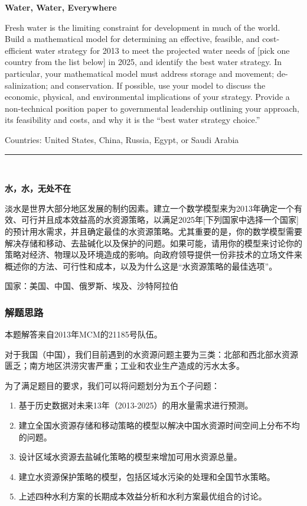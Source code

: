 \documentclass[bwprint]{cumcmthesis}
\begin{document}
\begin{shaded}
\renewcommand{\baselinestretch}{1.0}
\begin{center}
\textbf{Water, Water, Everywhere}
\end{center}

\small\noindent
Fresh water is the limiting constraint for development in much of the world. Build a mathematical model for determining an effective, feasible, and cost-efficient water strategy for 2013 to meet the projected water needs of [pick one country from the list below] in 2025, and identify the best water strategy. In particular, your mathematical model must address storage and movement; de-salinization; and conservation. If possible, use your model to discuss the economic, physical, and environmental implications of your strategy. Provide a non-technical position paper to governmental leadership outlining your approach, its feasibility and costs, and why it is the “best water strategy choice.”
\newline

\noindent Countries: United States, China, Russia, Egypt, or Saudi Arabia

\noindent\rule{\textwidth}{0.1mm}
\normalsize\ 
\begin{center}
\textbf{水，水，无处不在}
\end{center}

\small\noindent 
淡水是世界大部分地区发展的制约因素。建立一个数学模型来为2013年确定一个有效、可行并且成本效益高的水资源策略，以满足2025年[下列国家中选择一个国家]的预计用水需求，并且确定最佳的水资源策略。尤其重要的是，你的数学模型需要解决存储和移动、去盐碱化以及保护的问题。如果可能，请用你的模型来讨论你的策略对经济、物理以及环境造成的影响。向政府领导提供一份非技术的立场文件来概述你的方法、可行性和成本，以及为什么这是“水资源策略的最佳选项”。\newline

\noindent 国家：美国、中国、俄罗斯、埃及、沙特阿拉伯
\end{shaded}

\subsubsection{解题思路}

本题解答来自2013年MCM的21185号队伍。

对于我国（中国），我们目前遇到的水资源问题主要为三类：北部和西北部水资源匮乏；南方地区洪涝灾害严重；工业和农业生产造成的污水太多。

为了满足题目的要求，我们可以将问题划分为五个子问题：
\begin{enumerate}
\item 基于历史数据对未来13年（2013-2025）的用水量需求进行预测。
\item 建立全国水资源存储和移动策略的模型以解决中国水资源时间空间上分布不均的问题。
\item 设计区域水资源去盐碱化策略的模型来增加可用水资源总量。
\item 建立水资源保护策略的模型，包括区域水污染的处理和全国节水策略。
\item 上述四种水利方案的长期成本效益分析和水利方案最优组合的讨论。
\end{enumerate}
\end{document}
